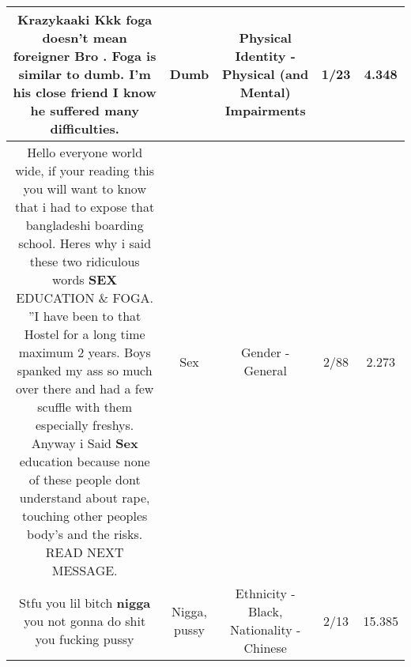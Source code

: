 \documentclass[11pt]{article}
\newlength\mylength
\begin{document}
\begin{center}
\begin{longtable}{|C{.65\mylength}|C{.30\mylength}|C{.12\mylength}|C{.12\mylength}|C{.12\mylength}|}
  \small Krazykaaki Kkk foga doesn't mean foreigner Bro . Foga is similar to \textbf{dumb}.  I'm his close friend I know he suffered many difficulties.\normalsize   & Dumb & Physical Identity - Physical (and Mental) Impairments & 1/23 & 4.348 \\  \hline
  \small Hello everyone world wide, if your reading this you will want to know that i had to expose that bangladeshi boarding school. Heres why i said these two ridiculous words \textbf{SEX} EDUCATION \& FOGA. ''I have been to that Hostel for a long time maximum 2 years. Boys spanked my ass so much over there and had a few scuffle with them especially freshys. Anyway i Said \textbf{Sex} education because  none of these people dont understand about rape, touching other peoples body's and the risks. READ NEXT MESSAGE.\normalsize   & Sex & Gender - General & 2/88 & 2.273 \\  \hline
  \small Stfu you lil bitch \textbf{nigga} you not gonna do shit you fucking pussy\normalsize   & Nigga, pussy & Ethnicity - Black, Nationality - Chinese & 2/13 & 15.385 \\  \hline
  
\end{longtable}
\end{center}
\end{document}

